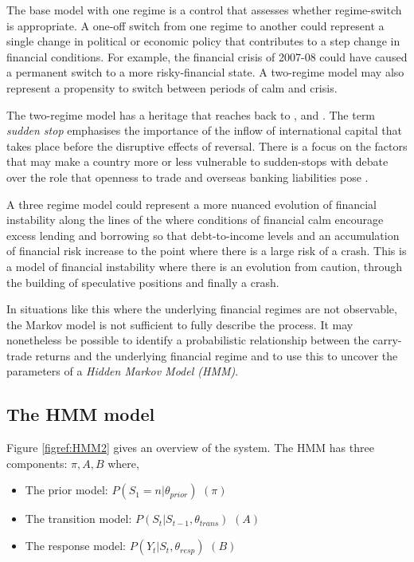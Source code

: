 \documentclass[12pt, a4paper, oneside]{article} %
\begin{document}
The base model with one regime is a control that assesses whether regime-switch is appropriate.  A one-off switch from one regime to another could represent a single change in political or economic policy that contributes to a step change in financial conditions.  For example, the financial crisis of 2007-08 could have caused a permanent switch to a more risky-financial state.  A two-regime model may also represent a propensity to switch between periods of calm and crisis.  

The two-regime model has a heritage that reaches back to \citet{DornbuschSS}, \citet{CalvoSS} and \citet{KrugmanSS}.  The term \emph{sudden stop} emphasises the importance of the inflow of international capital that takes place before the disruptive effects of reversal.  There is a focus on the factors that may make a country more or less vulnerable to sudden-stops with debate over the role that openness to trade \citet{Cavallo20081430} and overseas banking liabilities pose \citet{calvo2004empirics}.   
 
A three regime model could represent a more nuanced evolution of financial instability along the lines of the \citet{MinskyKeynes, MinskyFIH, MinskyLongerWaves} where conditions of financial calm encourage excess lending and borrowing so that debt-to-income levels  and an accumulation of financial risk increase to the point where there is a large risk of a crash.  This is a model of financial instability where there is an evolution from caution, through the building of speculative positions and finally a crash.  

In situations like this where the underlying financial regimes are not observable, the Markov model is not sufficient to fully describe the process. It may nonetheless be possible to identify a probabilistic relationship between the carry-trade returns and the underlying financial regime and to use this to uncover the parameters of a \emph{Hidden Markov Model (HMM)}. 
 
\subsection{The HMM model}
Figure \ref{figref:HMM2} gives an overview of the system.  The HMM has three components: $\pi, A, B$ where,

\begin{itemize}
\item The prior model: $P(S_1 = n| \theta_{prior})$ $(\pi)$
\item The transition model: $P(S_t| S_{t-1}, \theta_{trans})$ $(A)$
\item The response model: $P(Y_t| S_t, \theta_{resp})$ $(B)$
\end{itemize}
\end{document}

